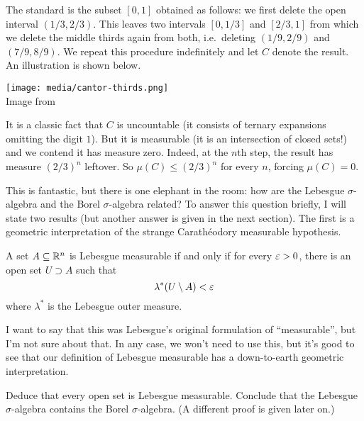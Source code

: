 \begin{example}
	The standard  is the subset
	$[0,1]$ obtained as follows:
	we first delete the open interval $(1/3, 2/3)$.
	This leaves two intervals $[0,1/3]$ and $[2/3,1]$
	from which we delete the middle thirds again from both,
	i.e.\ deleting $(1/9,2/9)$ and $(7/9,8/9)$.
	We repeat this procedure indefinitely and let $C$ denote the result.
	An illustration is shown below.
	\begin{center}
		\texttt{[image: media/cantor-thirds.png]} \\
		\footnotesize Image from \cite{img:cantor}
	\end{center}
	It is a classic fact that $C$ is uncountable
	(it consists of ternary expansions omitting the digit $1$).
	But it is measurable (it is an intersection of closed sets!)
	and we contend it has measure zero.
	Indeed, at the $n$th step, the result has measure $(2/3)^n$ leftover.
	So $\mu(C) \le (2/3)^n$ for every $n$, forcing $\mu(C) = 0$.
\end{example}

This is fantastic, but there is one elephant in the room:
how are the Lebesgue $\sigma$-algebra and the Borel $\sigma$-algebra related?
To answer this question briefly, I will state two results
(but another answer is given in the next section).
The first is a geometric interpretation of the strange
Carath\'{e}odory measurable hypothesis.
\begin{proposition}
	\label{prop:lebesgue_geo}
	A set $A \subseteq \mathbb R^n$ is Lebesgue measurable
	if and only if for every $\varepsilon > 0$,
	there is an open set $U \supset A$ such that
	\[ \lambda^\ast(U \setminus A) < \varepsilon \]
	where $\lambda^\ast$ is the Lebesgue outer measure.
\end{proposition}
I want to say that this was Lebesgue's original formulation
of ``measurable'', but I'm not sure about that.
In any case, we won't need to use this,
but it's good to see that our definition of Lebesgue measurable
has a down-to-earth geometric interpretation.

\begin{ques}
	Deduce that every open set is Lebesgue measurable.
	Conclude that the Lebesgue $\sigma$-algebra
	contains the Borel $\sigma$-algebra.
	(A different proof is given later on.)
\end{ques}


